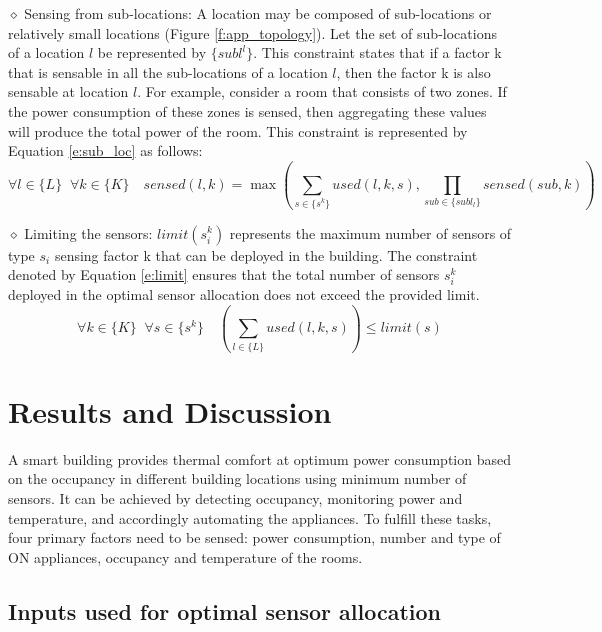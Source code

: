 \documentclass[]{interact}
\theoremstyle{plain}%
\theoremstyle{definition}
\theoremstyle{remark}
\begin{document}
  \noindent $\diamond$ Sensing from sub-locations: A location may be composed of sub-locations or relatively small locations (Figure \ref{f:app_topology}). Let the set of sub-locations of a location $l$ be represented by $\{subl^l\}$. This constraint states that if a factor k that is sensable in all the sub-locations of a location $l$, then the factor k is also sensable at location $l$. For example, consider a room that consists of two zones. 
  If the power consumption of these zones is sensed, then aggregating these values will produce the total power of the room.
  This constraint is represented by Equation \eqref{e:sub_loc} as follows:
\begin{equation}
    \label{e:sub_loc}
    \forall l \in \{L\} \;\; \forall k \in \{K\} \quad sensed(l,k) = \max \left(
  \sum_{s \in \{s^k\}}  used(l,k,s) , 
  \prod_{sub \in \{subl_l\}} sensed(sub,k)
  \right)
  \end{equation}

  \noindent $\diamond$ Limiting the sensors: $limit(s_i^k)$ represents the maximum number of sensors of type $s_i$ sensing factor k that can be deployed in the building.
  The constraint denoted by Equation \eqref{e:limit} ensures that the total number of sensors $s_i^k$ deployed in the optimal sensor allocation does not exceed the provided limit.
\begin{equation}
  \label{e:limit}
    \forall k \in \{K\} \;\; \forall s \in \{s^k\} \quad \left(
      \sum_{l \in \{L\}} used(l,k,s)
    \right) \leq limit(s)
   \end{equation}


\section{Results and Discussion}

A smart building provides thermal comfort at optimum power consumption based on the occupancy in different building locations using minimum number of sensors. 
It can be achieved by detecting occupancy, monitoring power and temperature, and accordingly automating the appliances.
To fulfill these tasks, four primary factors need to be sensed: power consumption, number and type of ON appliances, occupancy and temperature of the rooms.

\subsection{Inputs used for optimal sensor allocation}
\end{document}
